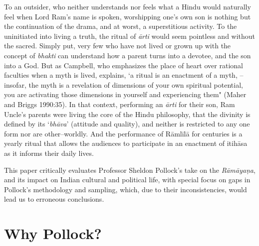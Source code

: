 To an outsider, who neither understands nor feels what a Hindu would naturally feel when Lord Ram’s name is spoken, worshipping one's own son is nothing but the continuation of the drama, and at worst, a superstitious activity. To the uninitiated into living a truth, the ritual of \textit{ārti} would seem pointless and without the sacred. Simply put, very few who have not lived or grown up with the concept of \textit{bhakti} can understand how a parent turns into a devotee, and the son into a God. But as Campbell, who emphasizes the place of heart over rational faculties when a myth is lived, explains, ‘a ritual is an enactment of a myth, – insofar, the myth is a revelation of dimensions of your own spiritual potential, you are activating those dimensions in yourself and experiencing them" (Maher and Briggs 1990:35). In that context, performing an \textit{ārti} for their son, Ram Uncle’s parents were living the core of the Hindu philosophy, that the divinity is defined by its ‘\textit{bhāva}’ (attitude and quality), and neither is restricted to any one form nor are other–worldly. And the performance of Rāmlīlā for centuries is a yearly ritual that allows the audiences to participate in an enactment of itihāsa as it informs their daily lives.

This paper critically evaluates Professor Sheldon Pollock’s take on the \textit{Rāmāyaṇa}, and its impact on Indian cultural and political life, with special focus on gaps in Pollock’s methodology and sampling, which, due to their inconsistencies, would lead us to erroneous conclusions.


\section*{Why Pollock?}

